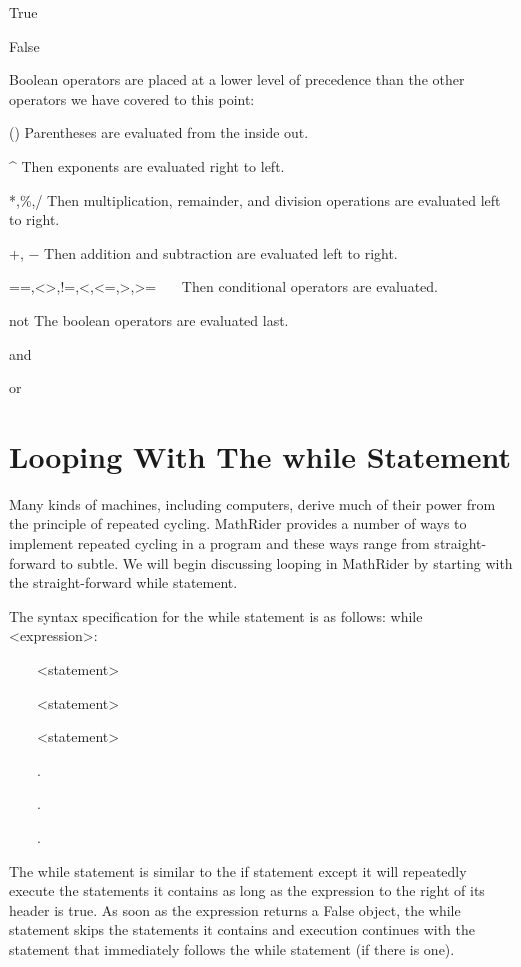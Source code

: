 \documentclass[12pt,oneside]{book}
\begin{document}
True

False

Boolean operators are placed at a lower level of precedence than the other operators we have covered to this point:


() Parentheses are evaluated from the inside out.


\^{} Then exponents are evaluated right to left.


*,\%,/ Then multiplication, remainder, and division operations are evaluated left to right. 

+, $-$ Then addition and subtraction are evaluated left to right.


==,{\textless}{\textgreater},!=,{\textless},{\textless}=,{\textgreater},{\textgreater}= \ \ \ Then conditional operators are evaluated.


not The boolean operators are evaluated last.


and 


or 

\section[Looping With The while Statement]{Looping With The while Statement}

Many kinds of machines, including computers, derive much of their power from the principle of repeated cycling. MathRider provides a number of ways to implement repeated cycling in a program and these ways range from straight{}-forward to subtle. We will begin discussing looping in MathRider by starting with the straight{}-forward while statement. 

The syntax specification for the while statement is as follows:
while {\textless}expression{\textgreater}:

\ \ \ \ {\textless}statement{\textgreater}

\ \ \ \ {\textless}statement{\textgreater}

\ \ \ \ {\textless}statement{\textgreater}

\ \ \ \ .

\ \ \ \ .

\ \ \ \ .


The while statement is similar to the if statement except it will repeatedly execute the statements it contains as long as the expression to the right of its header is true. As soon as the expression returns a False object, the while statement skips the statements it contains and execution continues with the statement that immediately follows the while statement (if there is one).  
\end{document}
